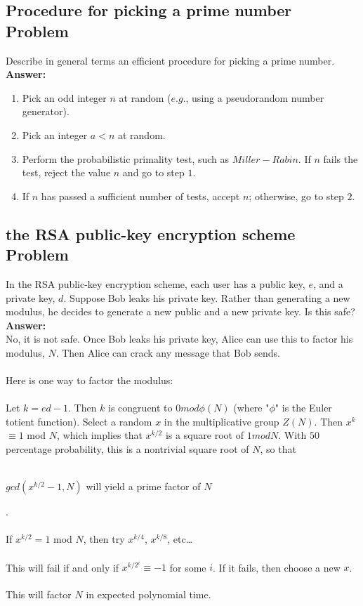 \documentclass[paper=a4, fontsize=11pt]{scrartcl} %
\numberwithin{equation}{section} %
\numberwithin{figure}{section} %
\numberwithin{table}{section} %
\begin{document}
 \subsection{Procedure for picking a prime number Problem \uppercase\expandafter{}}

 Describe in general terms an efficient procedure for picking a prime number.\\

 \textbf{Answer:}

 \begin{enumerate}
 \item Pick an odd integer $n$ at random ($e.g.$, using a pseudorandom number generator).
 \item Pick an integer $a < n$ at random.
 \item  Perform the probabilistic primality test, such as $Miller-Rabin$. If $n$ fails the test, reject the value $n$ and go to step $1$.
 \item  If $n$ has passed a sufficient number of tests, accept $n$; otherwise, go to step $2$.
 \end{enumerate}


 \subsection{the RSA public-key encryption scheme Problem \uppercase\expandafter{}}

 In the RSA public-key encryption scheme, each user has a public key, $e$, and a private key, $d$. Suppose Bob leaks his private key. Rather than generating a new modulus, he decides to generate a new public and a new private key. Is this safe?\\

 \textbf{Answer:}\\

 No, it is not safe. Once Bob leaks his private key, Alice can use this to factor his modulus, $N$. Then Alice can crack any message that Bob sends.\\
 \\
 Here is one way to factor the modulus:\\
 \\
 Let $k=ed-1$. Then $k$ is congruent to $0 mod \phi(N)$ (where "$\phi$" is the Euler totient function). Select a random $x$ in the multiplicative group $Z(N)$. Then $x^{k}$ $\equiv 1$ mod $N$, which implies that $x^{k/2}$ is a square root of $1 mod N$. With $50$ percentage probability, this is a nontrivial square root of $N$, so that\\
  \\
  \centerline{$gcd(x^{k/2}-1, N)$ \hspace{0.2cm} will yield a prime factor of $N$}. \\
  \\
  If $x^{k/2} = 1$ mod $N$, then try $x^{k/4}$, $x^{k/8}$, etc\ldots \\
  \\
  This will fail if and only if  $x^{k/2^{i}} \equiv-1$ for some $i$. If it fails, then choose a new $x$. \\
  \\
  This will factor $N$ in expected polynomial time.
\end{document}
